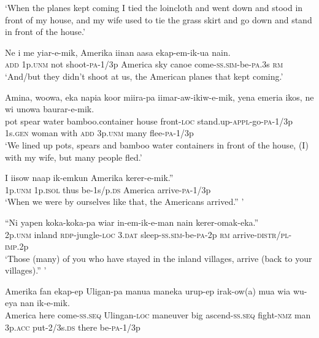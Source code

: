 \glt ‘When the planes kept coming I tied the loincloth and went down and stood in front of my house, and my wife used to tie the grass skirt and go down and stand in front of the house.’ \\
\z


\ea\label{ex:a:x116}
\gll  Ne  i  me  yiar-e-mik,  Amerika  iinan  aasa      ekap-em-ik-ua  nain. \\
\textsc{add}  1p.\textsc{unm}  not  shoot-\textsc{pa}-1/3p  America  sky  canoe    come-\textsc{ss}.\textsc{sim}-be-\textsc{pa}.3s  \textsc{rm} \\


\glt ‘And/but they didn’t shoot at us, the American planes that kept coming.’ \\
\z


\ea\label{ex:a:x117}
\gll  Amina,  woowa,  eka  napia  koor  miira-pa       iimar-aw-ikiw-e-mik,  yena  emeria  ikos,  ne        wi  unowa  baurar-e-mik. \\
pot  spear  water  bamboo.container  house  front-\textsc{loc}  stand.up-\textsc{appl}-go-\textsc{pa}-1/3p  1s.\textsc{gen}  woman  with  \textsc{add}   3p.\textsc{unm}  many  flee-\textsc{pa}-1/3p \\




\glt ‘We lined up pots, spears and bamboo water containers in front of the house, (I) with my wife, but many people fled.’ \\
\z


\ea\label{ex:a:x118}
\gll  I  iisow  naap  ik-emkun  Amerika  kerer-e-mik.” \\
1p.\textsc{unm}  1p.\textsc{isol}  thus  be-1s/p.\textsc{ds}  America  arrive-\textsc{pa}-1/3p \\
\glt ‘When we were by ourselves like that, the Americans arrived.” ’ \\
\z


\ea\label{ex:a:x119}
\gll  “Ni  yapen  koka-koka-pa  wiar  in-em-ik-e-man          nain  kerer-omak-eka.” \\
2p.\textsc{unm}  inland  \textsc{rdp}-jungle-\textsc{loc}  3.\textsc{dat}  sleep-\textsc{ss}.\textsc{sim}-be-\textsc{pa}-2p  \textsc{rm}  arrive-\textsc{distr}/\textsc{pl}-\textsc{imp}.2p \\


\glt ‘Those (many) of you who have stayed in the inland villages, arrive (back to your villages).” ’ \\
\z


\ea\label{ex:a:x120}
\gll  Amerika  fan  ekap-ep  Uligan-pa  manua  maneka   urup-ep  irak-ow(a)  mua  wia  wu-eya  nan                   ik-e-mik. \\
America  here  come-\textsc{ss.seq}  Ulingan-\textsc{loc}  maneuver  big  ascend-\textsc{ss.seq}  fight-\textsc{nmz}  man  3p.\textsc{acc}  put-2/3s.\textsc{ds}  there    be-\textsc{pa}-1/3p \\




